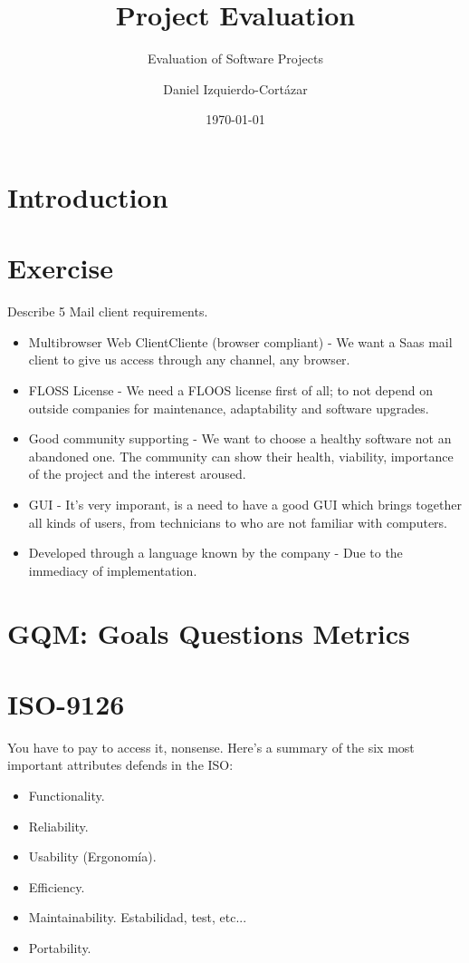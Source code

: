 \documentclass[11pt]{scrartcl}
\title{\textbf{Project Evaluation}}
\subtitle{Evaluation of Software Projects}
\author{Daniel Izquierdo-Cortázar}
\date{\today}
\begin{document}
\maketitle

\section{Introduction}

\section{Exercise}

Describe 5 Mail client requirements.

\begin{itemize}
    \item Multibrowser Web ClientCliente (browser compliant) - We want a Saas mail client to give us access through any channel, any browser.
    \item FLOSS License - We need a FLOOS license first of all; to not depend on outside companies for maintenance, adaptability and software upgrades.
    \item Good community supporting - We want to choose a healthy software not an abandoned one. The community can show their health, viability, importance of the project and the interest aroused.
    \item GUI - It's very  imporant, is a need to have a good GUI which brings together all kinds of users, from technicians to who are not familiar with computers.
    \item Developed through a language known by the company - Due to the immediacy of implementation.
\end{itemize}

\section{GQM: Goals Questions Metrics}

\section{ISO-9126}

You have to pay to access it, nonsense. Here's a summary of the six most important attributes defends in the ISO:
\begin{itemize}
    \item Functionality.
    \item Reliability.
    \item Usability (Ergonomía).
    \item Efficiency.
    \item Maintainability. Estabilidad, test, etc...
    \item Portability.
\end{itemize}
\end{document}
